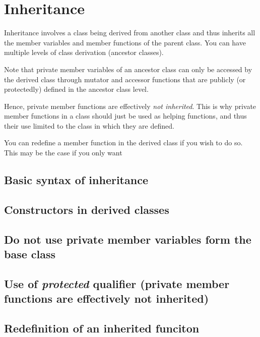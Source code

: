 \section{Inheritance}
Inheritance involves a class being derived from another class and thus
inherits all the member variables and member functions of the parent class.
You can have multiple levels of class derivation (ancestor classes).

Note that private member variables of an ancestor class can only be accessed
by the derived class through mutator and accessor functions that are publicly
(or protectedly) defined in the ancestor class level.

Hence, private member functions are effectively \emph{not inherited}. This is
why private member functions in a class should just be used as helping
functions, and thus their use limited to the class in which they are defined.

You can redefine a member function in the derived class if you wish to do so. This
may be the case if you only want 


\subsection{Basic syntax of inheritance}






\subsection{Constructors in derived classes}



\subsection{Do not use private member variables form the base class}



\subsection{Use of \emph{protected} qualifier (private member functions are effectively not inherited)}



\subsection{Redefinition of an inherited funciton}

























